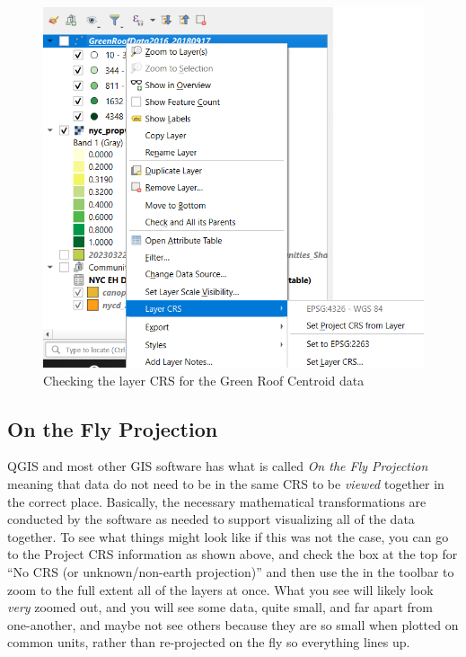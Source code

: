 \documentclass[
  letterpaper,
  DIV=11,
  numbers=noendperiod]{scrreprt}
\begin{document}
\begin{figure}

{\centering \includegraphics{./images/CheckLayerCRS.png}

}

\caption{Checking the layer CRS for the Green Roof Centroid data}

\end{figure}

\hypertarget{on-the-fly-projection}{%
\subsection{On the Fly Projection}\label{on-the-fly-projection}}

QGIS and most other GIS software has what is called \emph{On the Fly
Projection} meaning that data do not need to be in the same CRS to be
\emph{viewed} together in the correct place. Basically, the necessary
mathematical transformations are conducted by the software as needed to
support visualizing all of the data together. To see what things might
look like if this was not the case, you can go to the Project CRS
information as shown above, and check the box at the top for ``No CRS
(or unknown/non-earth projection)'' and then use the
 in the
toolbar to zoom to the full extent all of the layers at once. What you
see will likely look \emph{very} zoomed out, and you will see some data,
quite small, and far apart from one-another, and maybe not see others
because they are so small when plotted on common units, rather than
re-projected on the fly so everything lines up.
\end{document}
